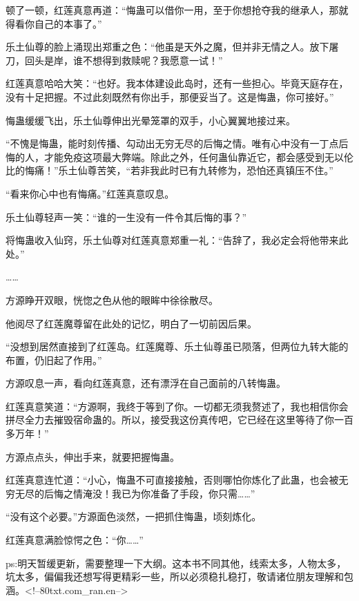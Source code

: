 \begin{this_body}
顿了一顿，红莲真意再道：“悔蛊可以借你一用，至于你想抢夺我的继承人，那就得看你自己的本事了。”

乐土仙尊的脸上涌现出郑重之色：“他虽是天外之魔，但并非无情之人。放下屠刀，回头是岸，谁不想得到救赎呢？我愿意一试！”

红莲真意哈哈大笑：“也好。我本体建设此岛时，还有一些担心。毕竟天庭存在，没有十足把握。不过此刻既然有你出手，那便妥当了。这是悔蛊，你可接好。”

悔蛊缓缓飞出，乐土仙尊伸出光晕笼罩的双手，小心翼翼地接过来。

“不愧是悔蛊，能时刻传播、勾动出无穷无尽的后悔之情。唯有心中没有一丁点后悔的人，才能免疫这项最大弊端。除此之外，任何蛊仙靠近它，都会感受到无以伦比的悔痛！”乐土仙尊苦笑，“若非我此时已有九转修为，恐怕还真镇压不住。”

“看来你心中也有悔痛。”红莲真意叹息。

乐土仙尊轻声一笑：“谁的一生没有一件令其后悔的事？”

将悔蛊收入仙窍，乐土仙尊对红莲真意郑重一礼：“告辞了，我必定会将他带来此处。”

……

方源睁开双眼，恍惚之色从他的眼眸中徐徐散尽。

他阅尽了红莲魔尊留在此处的记忆，明白了一切前因后果。

“没想到居然直接到了红莲岛。红莲魔尊、乐土仙尊虽已陨落，但两位九转大能的布置，仍旧起了作用。”

方源叹息一声，看向红莲真意，还有漂浮在自己面前的八转悔蛊。

红莲真意笑道：“方源啊，我终于等到了你。一切都无须我赘述了，我也相信你会拼尽全力去摧毁宿命蛊的。所以，接受我这份真传吧，它已经在这里等待了你一百多万年！”

方源点点头，伸出手来，就要把握悔蛊。

红莲真意连忙道：“小心，悔蛊不可直接接触，否则哪怕你炼化了此蛊，也会被无穷无尽的后悔之情淹没！我已为你准备了手段，你只需……”

“没有这个必要。”方源面色淡然，一把抓住悔蛊，顷刻炼化。

红莲真意满脸惊愕之色：“你……”

ps:明天暂缓更新，需要整理一下大纲。这本书不同其他，线索太多，人物太多，坑太多，偏偏我还想写得更精彩一些，所以必须稳扎稳打，敬请诸位朋友理解和包涵。<!--80txt.com\_ran.en-->

\end{this_body}

